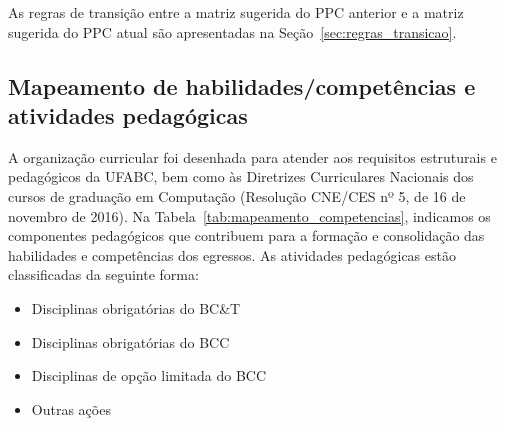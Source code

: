 As regras de transição entre a matriz sugerida do PPC anterior e a matriz
sugerida do PPC atual são apresentadas na Seção~\ref{sec:regras_transicao}.

\subsection{Mapeamento de habilidades/competências e atividades pedagógicas}

A organização curricular foi desenhada para atender aos requisitos estruturais
e pedagógicos da UFABC, bem como às Diretrizes Curriculares Nacionais dos
cursos de graduação em Computação (Resolução CNE/CES nº 5, de 16 de novembro de
2016).
Na Tabela~\ref{tab:mapeamento_competencias}, indicamos os componentes
pedagógicos que contribuem para a formação e consolidação das habilidades e
competências dos egressos.
As atividades pedagógicas estão classificadas da seguinte forma:

\begin{itemize}
    \item \textcolor{nred}{Disciplinas obrigatórias do BC\&T}
    \item \textcolor{nblue}{Disciplinas obrigatórias do BCC}
    \item \textcolor{nyellow}{Disciplinas de opção limitada do BCC}
    \item \textcolor{npurple}{Outras ações}
\end{itemize}


